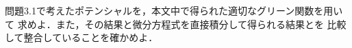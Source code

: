 \begin{bx1}
  問題3.1で考えたポテンシャルを，本文中で得られた適切なグリーン関数を用いて
  求めよ．また，その結果と微分方程式を直接積分して得られる結果とを
  比較して整合していることを確かめよ．
\end{bx1}

\clearpage
